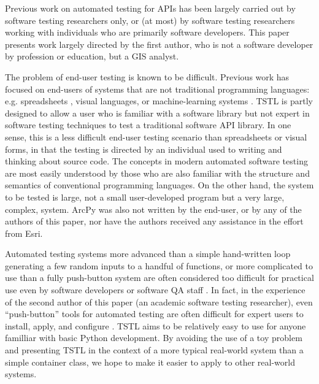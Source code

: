 Previous work on automated testing for APIs has been largely carried
out by software testing researchers only, or (at most) by software
testing researchers working with individuals who are primarily
software developers.  This paper presents work largely directed by
the first author, who is not a software developer by
profession or education, but a GIS analyst.  

The problem of end-user testing
\cite{burnettEUSE,Silos,rothermelTOSEM} is known to be difficult.
Previous work has focused on end-users of systems that are not
traditional programming languages: e.g. spreadsheets
\cite{rothermelTOSEM}, visual languages, or machine-learning systems
\cite{OnlyOracle}.  TSTL is partly designed to allow a user who is
familiar with a software library but not expert in software testing
techniques to test a traditional software API library.  In one sense,
this is a less difficult end-user testing scenario than spreadsheets
or visual forms, in that the testing is directed by an individual used
to writing and thinking about source code.  The concepts in
modern automated software testing are most easily understood by those
who are also familiar with the structure and semantics of conventional
programming languages.  On the other hand, the system to be tested is
large, not a small user-developed program but a very large, complex, system.
ArcPy was also not written by the end-user, or by any of the authors
of this paper, nor have the authors received any assistance in the
effort from Esri.

Automated testing systems more advanced than a simple hand-written loop generating 
a few random inputs to a handful of functions, or more complicated to 
use than a fully push-button system are often considered too difficult 
for practical use even by software developers or software QA staff \cite{ISSRE12}.
In fact, in the experience of the second author of this paper (an
academic software testing researcher), even ``push-button'' tools for
automated testing are often difficult for expert users to install, apply, and
configure \cite{AMAI,CFV08,ISSRE12}.  TSTL aims to be relatively easy to
use for anyone familliar with basic Python development.  By avoiding
the use of a toy problem and presenting TSTL in the context of a more
typical real-world system than a simple container class, we hope to
make it easier to apply to other real-world systems.



